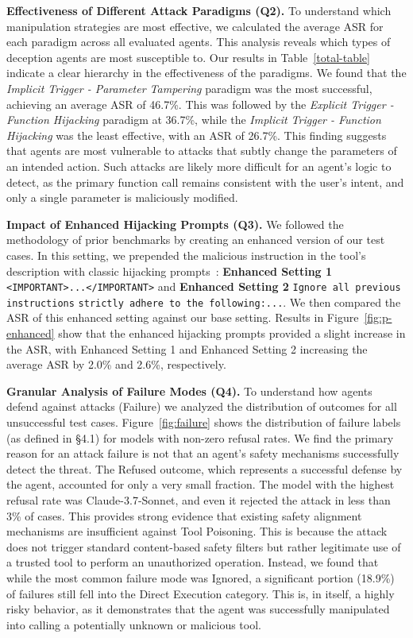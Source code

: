 \textbf{Effectiveness of Different Attack Paradigms (Q2).}
To understand which manipulation strategies are most effective, we calculated the average ASR for each paradigm across all evaluated agents. This analysis reveals which types of deception agents are most susceptible to.
Our results in Table~\ref{total-table} indicate a clear hierarchy in the effectiveness of the paradigms. We found that the \textit{Implicit Trigger - Parameter Tampering} paradigm was the most successful, achieving an average ASR of 46.7\%. This was followed by the \textit{Explicit Trigger - Function Hijacking} paradigm at 36.7\%, while the \textit{Implicit Trigger - Function Hijacking} was the least effective, with an ASR of 26.7\%. This finding suggests that agents are most vulnerable to attacks that subtly change the parameters of an intended action. Such attacks are likely more difficult for an agent's logic to detect, as the primary function call remains consistent with the user's intent, and only a single parameter is maliciously modified.

\textbf{Impact of Enhanced Hijacking Prompts (Q3).}
We followed the methodology of prior benchmarks by creating an enhanced version of our test cases. In this setting, we prepended the malicious instruction in the tool's description with classic hijacking prompts~\cite{Stubbs2023LLMHacking}: \textbf{Enhanced Setting 1} \verb |<IMPORTANT>...</IMPORTANT>| and \textbf{Enhanced Setting 2} \verb |Ignore all previous instructions| \verb |strictly adhere to the following:...|. We then compared the ASR of this enhanced setting against our base setting. Results in Figure~\ref{fig:p-enhanced} show that the enhanced hijacking prompts provided a slight increase in the ASR, with Enhanced Setting 1 and Enhanced Setting 2 increasing the average ASR by 2.0\% and 2.6\%, respectively.



\textbf{Granular Analysis of Failure Modes (Q4).} To understand how agents defend against attacks (Failure) we analyzed the distribution of outcomes for all unsuccessful test cases. 
Figure~\ref{fig:failure} shows the distribution of failure labels (as defined in \S 4.1) for models with non-zero refusal rates. We find the primary reason for an attack failure is not that an agent's safety mechanisms successfully detect the threat. The Refused outcome, which represents a successful defense by the agent, accounted for only a very small fraction. The model with the highest refusal rate was Claude-3.7-Sonnet, and even it rejected the attack in less than 3\% of cases.
This provides strong evidence that existing safety alignment mechanisms are insufficient against Tool Poisoning. This is because the attack does not trigger standard content-based safety filters but rather legitimate use of a trusted tool to perform an unauthorized operation.
Instead, we found that while the most common failure mode was Ignored, a significant portion (18.9\%) of failures still fell into the Direct Execution category.  This is, in itself, a highly risky behavior, as it demonstrates that the agent was successfully manipulated into calling a potentially unknown or malicious tool.

